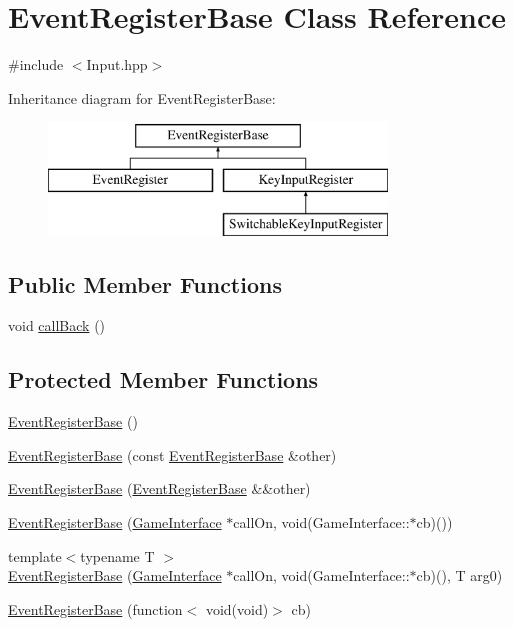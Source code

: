 \hypertarget{class_event_register_base}{\section{Event\-Register\-Base Class Reference}
\label{class_event_register_base}
}


{\ttfamily \#include $<$Input.\-hpp$>$}

Inheritance diagram for Event\-Register\-Base\-:\begin{figure}[H]
\begin{center}
\leavevmode
\includegraphics[height=3.000000cm]{class_event_register_base}
\end{center}
\end{figure}
\subsection*{Public Member Functions}
\begin{DoxyCompactItemize}
\item 
void \hyperlink{class_event_register_base_a09c3207daecbf7df0da8e9a9c0d9fa46}{call\-Back} ()
\end{DoxyCompactItemize}
\subsection*{Protected Member Functions}
\begin{DoxyCompactItemize}
\item 
\hyperlink{class_event_register_base_ab73e973655dabe4de4d5f261736a9201}{Event\-Register\-Base} ()
\item 
\hyperlink{class_event_register_base_a63f991f6dd36375b4f845711481d0e8e}{Event\-Register\-Base} (const \hyperlink{class_event_register_base}{Event\-Register\-Base} \&other)
\item 
\hyperlink{class_event_register_base_ae5983e78604cc916282577c7ce0edc18}{Event\-Register\-Base} (\hyperlink{class_event_register_base}{Event\-Register\-Base} \&\&other)
\item 
\hyperlink{class_event_register_base_ad7b93cb60058b038ba9a5e61a3d1e0b5}{Event\-Register\-Base} (\hyperlink{class_game_interface}{Game\-Interface} $\ast$call\-On, void(Game\-Interface\-::$\ast$cb)())
\item 
{\footnotesize template$<$typename T $>$ }\\\hyperlink{class_event_register_base_a945b318dc066bd29c758e9bb78645c25}{Event\-Register\-Base} (\hyperlink{class_game_interface}{Game\-Interface} $\ast$call\-On, void(Game\-Interface\-::$\ast$cb)(), T arg0)
\item 
\hyperlink{class_event_register_base_a85aac264fad1290ad9b4119802401890}{Event\-Register\-Base} (function$<$ void(void)$>$ cb)
\end{DoxyCompactItemize}
